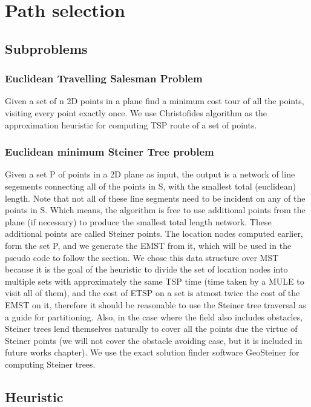 \chapter{Path selection}
\label{chap:steiner}

\section{Subproblems}

\subsection{Euclidean Travelling Salesman Problem}
Given a set of n 2D points in a plane find a minimum cost tour of all the points, visiting every point exactly once. We use Christofides algorithm \cite{christofides} as the approximation heuristic for computing TSP route of a set of points.

\subsection{Euclidean minimum Steiner Tree problem}
Given a set P of points in a 2D plane as input, the output is a network of line segements connecting all of the points in S, with the smallest total (euclidean) length. Note that not all of these line segments need to be incident on any of the points in S. Which means, the algorithm is free to use additional points from the plane (if necessary) to produce the smallest total length network. These additional points are called Steiner points.
The location nodes computed earlier, form the set P, and we generate the EMST from it, which will be used in the pseudo code to follow the section.
We chose this data structure over MST because it is the goal of the heuristic to divide the set of location nodes into multiple sets with approximately the same TSP time (time taken by a MULE to visit all of them), and the cost of ETSP on a set is atmost twice the cost of the EMST on it, therefore it should be reasonable to use the Steiner tree traversal as a guide for partitioning. Also, in the case where the field also includes obstacles, Steiner trees lend themselves naturally to cover all the points due the virtue of Steiner points \cite{oaest99} (we will not cover the obstacle avoiding case, but it is included in future works chapter).
We use the exact solution finder software GeoSteiner \cite{geosteiner1} \cite{geosteiner2} \cite{geosteiner3} for computing Steiner trees.

\section{Heuristic}

